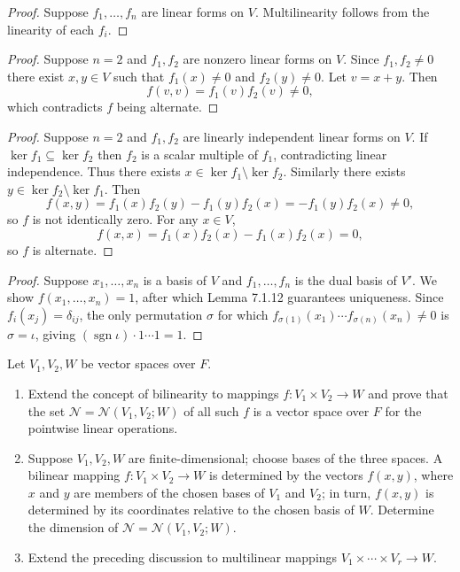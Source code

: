 \begin{proof}
    Suppose $f_1, \ldots, f_n$ are linear forms on $V$.
    Multilinearity follows from the linearity of each $f_i$.
\end{proof}

\begin{proof}
    Suppose $n = 2$ and $f_1, f_2$ are nonzero linear forms on $V$.
    Since $f_1, f_2 \ne 0$ there exist $x, y \in V$ such that
    $f_1(x) \ne 0$ and $f_2(y) \ne 0$.
    Let $v = x + y$. Then
    \[
        f(v, v) = f_1(v)f_2(v) \ne 0,
    \]
    which contradicts $f$ being alternate.
\end{proof}

\begin{proof}
    Suppose $n = 2$ and $f_1, f_2$ are linearly independent linear forms on $V$.
    If $\ker f_1 \subseteq \ker f_2$ then $f_2$ is a scalar multiple of $f_1$,
        contradicting linear independence.
    Thus there exists $x \in \ker f_1 \setminus \ker f_2$.
    Similarly there exists $y \in \ker f_2 \setminus \ker f_1$.
    Then
    \[f(x, y) = f_1(x)f_2(y) - f_1(y)f_2(x) = -f_1(y)f_2(x) \ne 0,\]
    so $f$ is not identically zero. For any $x \in V$,
    \[f(x, x) = f_1(x)f_2(x) - f_1(x)f_2(x) = 0,\]
    so $f$ is alternate.
\end{proof}

\begin{proof}
    Suppose $x_1, \ldots, x_n$ is a basis of $V$
        and $f_1, \ldots, f_n$ is the dual basis of $V'$.
    We show $f(x_1, \ldots, x_n) = 1$, after which Lemma 7.1.12 guarantees uniqueness.
    Since $f_i(x_j) = \delta_{ij}$, the only permutation $\sigma$ for which
    $f_{\sigma(1)}(x_1) \cdots f_{\sigma(n)}(x_n) \ne 0$ is $\sigma = \iota$,
    giving $(\operatorname{sgn} \iota) \cdot 1 \cdots 1 = 1$.
\end{proof}


\begin{tcolorbox}[title=Problem 3, breakable]
    Let $V_1, V_2, W$ be vector spaces over $F$.
    \begin{enumerate}
        \item Extend the concept of bilinearity to mappings $f : V_1 \times V_2 \longrightarrow W$ and
        prove that the set $\mathcal{N} = \mathcal{N}(V_1, V_2; W)$ of all such $f$ is a vector space
        over $F$ for the pointwise linear operations.
        \item Suppose $V_1, V_2, W$ are finite-dimensional; choose bases of the three spaces.
        A bilinear mapping $f : V_1 \times V_2 \longrightarrow W$ is determined by the
        vectors $f(x, y)$, where $x$ and $y$ are members of the chosen bases of $V_1$ and $V_2$;
        in turn, $f(x, y)$ is determined by its coordinates relative to the chosen basis of $W$. Determine
        the dimension of $\mathcal{N} = \mathcal{N}(V_1, V_2; W)$.
        \item Extend the preceding discussion to multilinear mappings $V_1 \times \cdots \times V_r \longrightarrow W$.
    \end{enumerate}
\end{tcolorbox}

